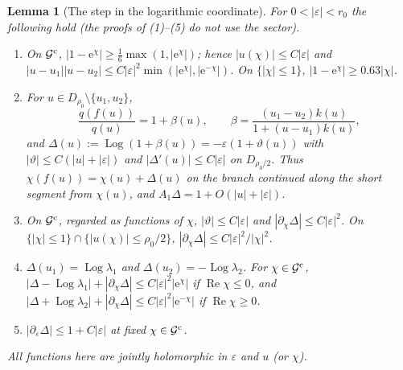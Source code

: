 \documentclass[11pt]{amsart}
\newtheorem{lemma}[theorem]{Lemma}
\theoremstyle{definition}
\newcommand{\eee}{\mathrm{e}}
\begin{document}
\begin{lemma}[The step in the logarithmic coordinate]\label{lem:cusp-step}
For $0<|\varepsilon|<r_0$ the following hold (the proofs of (1)--(5) do not use the
sector).
\begin{enumerate}
\item On $\mathcal G^{\rm c}$, $|1-\eee^\chi|\ge\tfrac16\max(1,|\eee^\chi|)$; hence
  $|u(\chi)|\le C|\varepsilon|$ and
  $|u-u_1||u-u_2|\le C|\varepsilon|^2\min(|\eee^\chi|,|\eee^{-\chi}|)$.
  On $\{|\chi|\le1\}$, $|1-\eee^\chi|\ge0.63|\chi|$.
\item For $u\in D_{\rho_0}\setminus\{u_1,u_2\}$,
  \[
   \frac{q(f(u))}{q(u)}=1+\beta(u),\qquad
   \beta=\frac{(u_1-u_2)k(u)}{1+(u-u_1)k(u)},
  \]
  and $\Delta(u):=\operatorname{Log}(1+\beta(u))=-\varepsilon(1+\vartheta(u))$ with
  $|\vartheta|\le C(|u|+|\varepsilon|)$ and $|\Delta'(u)|\le C|\varepsilon|$ on $D_{\rho_0/2}$.  Thus
  $\chi(f(u))=\chi(u)+\Delta(u)$ on the branch continued along the short
  segment from $\chi(u)$, and $A_1\Delta=1+O(|u|+|\varepsilon|)$.
\item On $\mathcal G^{\rm c}$, regarded as functions of $\chi$,
  $|\vartheta|\le C|\varepsilon|$ and $|\partial_\chi\Delta|\le C|\varepsilon|^2$.  On
  $\{|\chi|\le1\}\cap\{|u(\chi)|\le\rho_0/2\}$, $|\partial_\chi\Delta|\le C|\varepsilon|^2/|\chi|^2$.
\item $\Delta(u_1)=\operatorname{Log}\lambda_1$ and $\Delta(u_2)=-\operatorname{Log}\lambda_2$.
  For $\chi\in\mathcal G^{\rm c}$, $|\Delta-\operatorname{Log}\lambda_1|+|\partial_\chi\Delta|\le
  C|\varepsilon|^2|\eee^\chi|$ if $\operatorname{Re}\chi\le0$, and
  $|\Delta+\operatorname{Log}\lambda_2|+|\partial_\chi\Delta|\le C|\varepsilon|^2|\eee^{-\chi}|$
  if $\operatorname{Re}\chi\ge0$.
\item $|\partial_\varepsilon\Delta|\le1+C|\varepsilon|$ at fixed $\chi\in\mathcal G^{\rm c}$.
\end{enumerate}
All functions here are jointly holomorphic in $\varepsilon$ and $u$ (or $\chi$).
\end{lemma}
\end{document}
